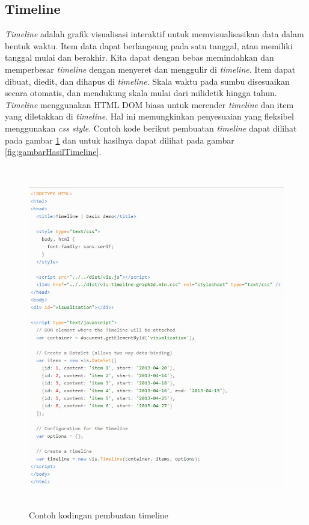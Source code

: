 \subsection{Timeline}
\textit{Timeline} adalah grafik visualisasi interaktif untuk memvisualisasikan data dalam bentuk waktu. Item data dapat berlangsung pada satu tanggal, atau memiliki tanggal mulai dan berakhir. Kita dapat dengan bebas memindahkan dan memperbesar \textit{timeline} dengan menyeret dan menggulir di \textit{timeline}. Item dapat dibuat, diedit, dan dihapus di \textit{timeline}. Skala waktu pada sumbu disesuaikan secara otomatis, dan mendukung skala mulai dari milidetik hingga tahun. \textit{Timeline} menggunakan HTML DOM biasa untuk merender \textit{timeline} dan item yang diletakkan di \textit{timeline}. Hal ini memungkinkan penyesuaian yang fleksibel menggunakan \textit{css style}. Contoh kode berikut pembuatan \textit{timeline} dapat dilihat pada gambar \ref{fig:gambarTimeline} dan untuk hasilnya dapat dilihat pada gambar \ref{fig:gambarHasilTimeline}.

\begin{figure}[H]
    \centering
    \includegraphics[width=12cm, height=15cm]{Gambar/timeline.jpg}
    \caption{Contoh kodingan pembuatan timeline}
    \label{fig:gambarTimeline}
\end{figure}

